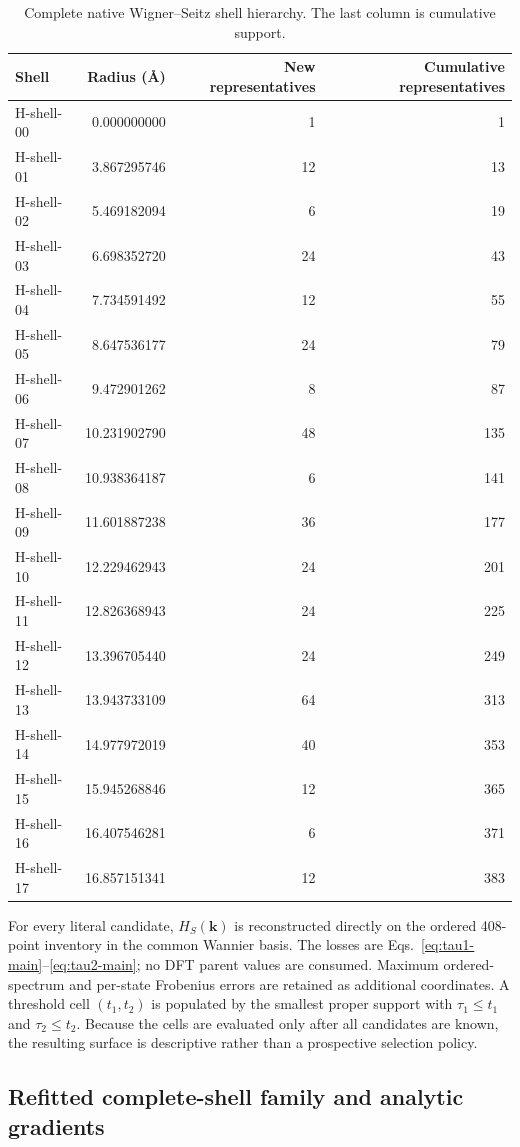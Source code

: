 \documentclass[11pt]{article}
\theoremstyle{definition}
\newcommand{\kvec}{\mathbf k}
\begin{document}
\begin{table}[tbp]
\centering
\small
\caption{Complete native Wigner--Seitz shell hierarchy.  The last column is cumulative
support.}
\label{tab:native-shells}
\begin{tabular}{@{}lrrr@{}}
\toprule
Shell & Radius (\AA) & New representatives & Cumulative representatives\\
\midrule
H-shell-00&0.000000000&1&1\\
H-shell-01&3.867295746&12&13\\
H-shell-02&5.469182094&6&19\\
H-shell-03&6.698352720&24&43\\
H-shell-04&7.734591492&12&55\\
H-shell-05&8.647536177&24&79\\
H-shell-06&9.472901262&8&87\\
H-shell-07&10.231902790&48&135\\
H-shell-08&10.938364187&6&141\\
H-shell-09&11.601887238&36&177\\
H-shell-10&12.229462943&24&201\\
H-shell-11&12.826368943&24&225\\
H-shell-12&13.396705440&24&249\\
H-shell-13&13.943733109&64&313\\
H-shell-14&14.977972019&40&353\\
H-shell-15&15.945268846&12&365\\
H-shell-16&16.407546281&6&371\\
H-shell-17&16.857151341&12&383\\
\bottomrule
\end{tabular}
\end{table}

For every literal candidate, $H_S(\kvec)$ is reconstructed directly on the ordered
408-point inventory in the common Wannier basis.  The losses are
Eqs.~\eqref{eq:tau1-main}--\eqref{eq:tau2-main}; no DFT parent values are consumed.
Maximum ordered-spectrum and per-state Frobenius errors are retained as additional
coordinates.  A threshold cell $(t_1,t_2)$ is populated by the smallest proper support
with $\tau_1\le t_1$ and $\tau_2\le t_2$.  Because the cells are evaluated only after
all candidates are known, the resulting surface is descriptive rather than a
prospective selection policy.

\subsection{Refitted complete-shell family and analytic gradients}
\end{document}
